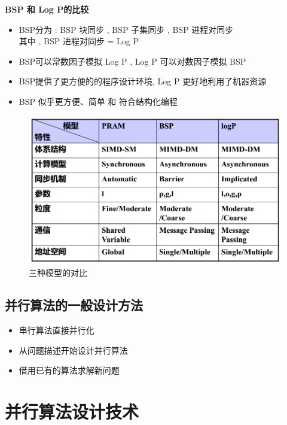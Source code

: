 \documentclass[UTF8,a4paper]{ctexart}
\begin{document}
  \textbf{BSP 和 Log P的比较}
  \begin{itemize}
    \item BSP分为 : BSP 块同步  , BSP 子集同步 , BSP 进程对同步\\
    其中 , BSP 进程对同步 = Log P
    \item BSP可以常数因子模拟 Log P , Log P 可以对数因子模拟 BSP
    \item BSP提供了更方便的的程序设计环境, Log P 更好地利用了机器资源
    \item BSP 似乎更方便、简单 和 符合结构化编程
  \end{itemize}

  \begin{figure}[H]
    \centering
    \includegraphics[scale = 0.3]{assets/ParallelComputing_e3d13.png}
    \caption{三种模型的对比}
  \end{figure}

  \subsection{并行算法的一般设计方法}
  \begin{itemize}
    \item 串行算法直接并行化
    \item 从问题描述开始设计并行算法
    \item 借用已有的算法求解新问题
  \end{itemize}

  \section{并行算法设计技术}
\end{document}

